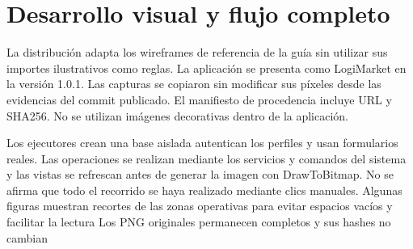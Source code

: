 
\section{Desarrollo visual y flujo completo}
La distribución adapta los wireframes de referencia de la guía sin utilizar sus importes ilustrativos como reglas. La aplicación se presenta como LogiMarket en la versión 1.0.1. Las capturas se copiaron sin modificar sus píxeles desde las evidencias del commit publicado. El manifiesto de procedencia incluye URL y SHA256. No se utilizan imágenes decorativas dentro de la aplicación.

Los ejecutores crean una base aislada autentican los perfiles y usan formularios reales. Las operaciones se realizan mediante los servicios y comandos del sistema y las vistas se refrescan antes de generar la imagen con DrawToBitmap. No se afirma que todo el recorrido se haya realizado mediante clics manuales.
Algunas figuras muestran recortes de las zonas operativas para evitar espacios vacíos y facilitar la lectura Los PNG originales permanecen completos y sus hashes no cambian

